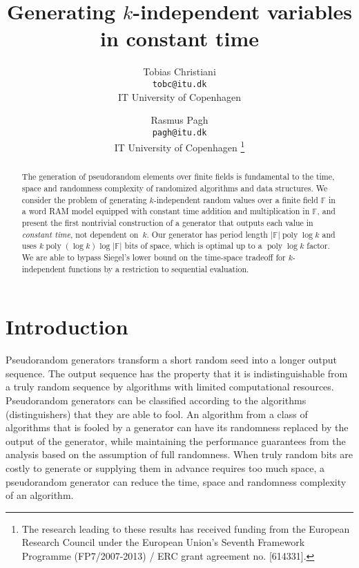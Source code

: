 \documentclass[a4paper,11pt]{article}
\theoremstyle{plain}
\theoremstyle{definition}
\newcommand{\F}{\mathbb{F}}
\DeclareMathOperator{\poly}{poly}
\begin{document}
\title{Generating $k$-independent variables in constant time}

\author{
	Tobias Christiani\\
	\small \texttt{tobc@itu.dk}\\
	\small IT University of Copenhagen
	\and
	Rasmus Pagh\\
	\small \texttt{pagh@itu.dk}\\
	\small IT University of Copenhagen
\thanks{The research leading to these results has received funding from the European Research Council under the European Union's Seventh Framework Programme (FP7/2007-2013) / ERC grant agreement no. [614331].}
}

\renewcommand\footnotemark{}

\date{\vspace{-5ex}}

\maketitle

\begin{abstract}
The generation of pseudorandom elements over finite fields is fundamental to the time, space and randomness complexity of randomized algorithms and data structures. 
We consider the problem of generating $k$-independent random values over a finite field $\F$ in a word RAM model equipped with constant time addition and multiplication in $\F$, and present the first nontrivial construction of a generator that outputs each value in \emph{constant time}, not dependent on~$k$.
Our generator has period length $|\F|\poly \log k$ and uses $k \poly(\log k) \log |\F|$ bits of space, which is optimal up to a $\poly \log k$ factor.
We are able to bypass Siegel's lower bound on the time-space tradeoff for \mbox{$k$-independent} functions by a restriction to sequential evaluation.  
\end{abstract}

\section{Introduction}
Pseudorandom generators transform a short random seed into a longer output sequence. 
The output sequence has the property that it is indistinguishable from a truly random sequence by algorithms with limited computational resources. 
Pseudorandom generators can be classified according to the algorithms (distinguishers) that they are able to fool.
An algorithm from a class of algorithms that is fooled by a generator can have its randomness replaced by the output of the generator,
while maintaining the performance guarantees from the analysis based on the assumption of full randomness.
When truly random bits are costly to generate or supplying them in advance requires too much space, a pseudorandom generator can reduce the time, space and randomness complexity of an algorithm.
\end{document}
